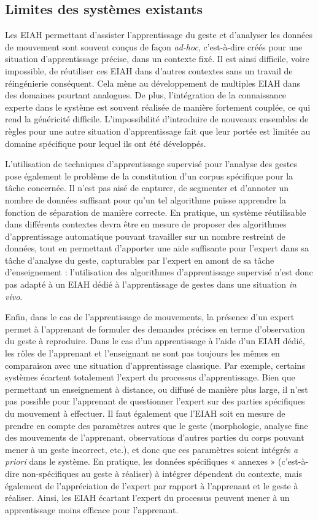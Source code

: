 \subsection{Limites des systèmes existants}
Les EIAH permettant d'assister l'apprentissage du geste et d'analyser les données de mouvement sont souvent conçus de façon \textit{ad-hoc}, c'est-à-dire créés pour une situation d'apprentissage précise, dans un contexte fixé. Il est ainsi difficile, voire impossible, de réutiliser ces EIAH dans d'autres contextes sans un travail de réingénierie conséquent. Cela mène au développement de multiples EIAH dans des domaines pourtant analogues. De plus, l'intégration de la connaissance experte dans le système est souvent réalisée de manière fortement couplée, ce qui rend la généricité difficile. L'impossibilité d'introduire de nouveaux ensembles de règles pour une autre situation d'apprentissage fait que leur portée est limitée au domaine spécifique pour lequel ils ont été développés.

L'utilisation de techniques d'apprentissage supervisé pour l'analyse des gestes pose également le problème de la constitution d'un corpus spécifique pour la tâche concernée. Il n'est pas aisé de capturer, de segmenter et d'annoter un nombre de données suffisant pour qu'un tel algorithme puisse apprendre la fonction de séparation de manière correcte. En pratique, un système réutilisable dans différents contextes devra être en mesure de proposer des algorithmes d'apprentissage automatique pouvant travailler sur un nombre restreint de données, tout en permettant d'apporter une aide suffisante pour l'expert dans sa tâche d'analyse du geste, capturables par l'expert en amont de sa tâche d'enseignement : l'utilisation des algorithmes d'apprentissage supervisé n'est donc pas adapté à un EIAH dédié à l'apprentissage de gestes dans une situation \textit{in vivo}.

Enfin, dans le cas de l'apprentissage de mouvements, la présence d'un expert permet à l'apprenant de formuler des demandes précises en terme d'observation du geste à reproduire. Dans le cas d'un apprentissage à l'aide d'un EIAH dédié, les rôles de l'apprenant et l'enseignant ne sont pas toujours les mêmes en comparaison avec une situation d'apprentissage classique. Par exemple, certains systèmes écartent totalement l'expert du processus d'apprentissage. Bien que permettant un enseignement à distance, ou diffusé de manière plus large, il n'est pas possible pour l'apprenant de questionner l'expert sur des parties spécifiques du mouvement à effectuer. Il faut également que l'EIAH soit en mesure de prendre en compte des paramètres autres que le geste (morphologie, analyse fine des mouvements de l'apprenant, observations d'autres parties du corps pouvant mener à un geste incorrect, etc.), et donc que ces paramètres soient intégrés \textit{a priori} dans le système. En pratique, les données spécifiques « annexes » (c'est-à-dire non-spécifiques au geste à réaliser) à intégrer dépendent du contexte, mais également de l'appréciation de l'expert par rapport à l'apprenant et le geste à réaliser. Ainsi, les EIAH écartant l'expert du processus peuvent mener à un apprentissage moins efficace pour l'apprenant.

